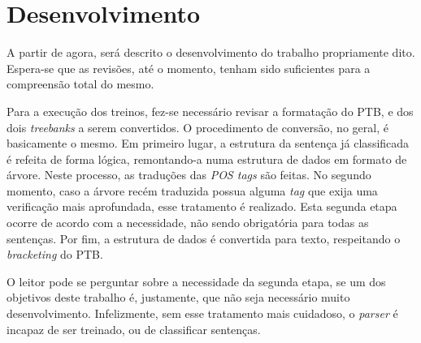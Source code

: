 \chapter{Desenvolvimento}
\label{cap:desenv}

A partir de agora, será descrito o desenvolvimento do trabalho propriamente dito. Espera-se que as revisões, até o momento, tenham sido suficientes para a compreensão total do mesmo.

Para a execução dos treinos, fez-se necessário revisar a formatação do PTB, e dos dois \textit{treebanks} a serem convertidos. O procedimento de conversão, no geral, é basicamente o mesmo. Em primeiro lugar, a estrutura da sentença já classificada é refeita de forma lógica, remontando-a numa estrutura de dados em formato de árvore. Neste processo, as traduções das \textit{POS tags} são feitas. No segundo momento, caso a árvore recém traduzida possua alguma \textit{tag} que exija uma verificação mais aprofundada, esse tratamento é realizado. Esta segunda etapa ocorre de acordo com a necessidade, não sendo obrigatória para todas as sentenças. Por fim, a estrutura de dados é convertida para texto, respeitando o \textit{bracketing} do PTB.

O leitor pode se perguntar sobre a necessidade da segunda etapa, se um dos objetivos deste trabalho é, justamente, que não seja necessário muito desenvolvimento. Infelizmente, sem esse tratamento mais cuidadoso, o \textit{parser} é incapaz de ser treinado, ou de classificar sentenças. 



